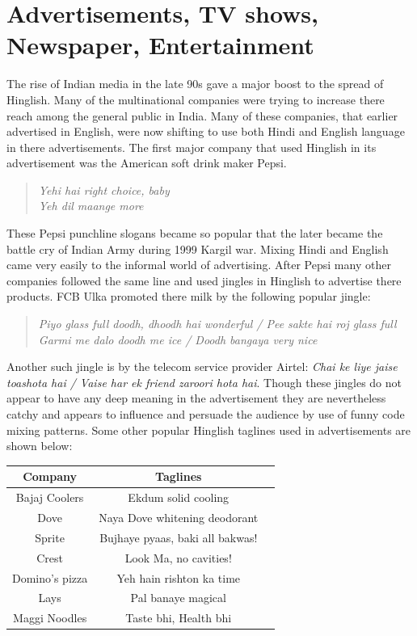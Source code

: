 \documentclass{article}
\begin{document}
\section{Advertisements, TV shows, Newspaper, Entertainment}
The rise of Indian media in the late 90s gave a major boost to the spread of Hinglish. Many of the multinational companies were trying to increase there reach among the general public in India. Many of these companies, that earlier advertised in English, were now shifting to use both Hindi and English language in there advertisements. The first major company that used Hinglish in its advertisement was the American soft drink maker Pepsi.
\begin{quote}
    \centering
    \textit{Yehi hai right choice, baby}\\
\textit{Yeh dil maange more}
\end{quote}
These Pepsi punchline slogans became so popular that the later became the battle cry of Indian Army during 1999 Kargil war. Mixing Hindi and English came very easily to the informal world of advertising. After Pepsi many other companies followed the same line and used jingles in Hinglish to advertise there products. FCB Ulka promoted there milk by the following popular jingle:
\begin{quote}
    \centering
    \textit{Piyo glass full doodh, dhoodh hai wonderful / Pee sakte hai roj glass full\\
    Garmi me dalo doodh me ice / Doodh bangaya very nice}

\end{quote}
Another such jingle is by the telecom service provider Airtel: \textit{Chai ke liye jaise toashota hai / Vaise har ek friend zaroori hota hai}. Though these jingles do not appear to have any deep meaning in the advertisement they are nevertheless catchy and appears to influence and persuade the audience by use of funny code mixing patterns. Some other popular Hinglish taglines used in advertisements are shown below:
\begin{table}[H]
\centering
\begin{tabular}{|c|c|c|}
\hline
\textbf{Company} & \textbf{Taglines}\\
\hline \hline
Bajaj Coolers  & Ekdum solid cooling \\\hline
Dove & Naya Dove whitening deodorant \\\hline
Sprite & Bujhaye pyaas, baki all bakwas! \\\hline
Crest & Look Ma, no cavities! \\\hline
Domino’s pizza & Yeh hain rishton ka time \\\hline
Lays & Pal banaye magical \\\hline
Maggi Noodles & Taste bhi, Health bhi \\\hline
\end{tabular}  
\end{table} 
\end{document}
